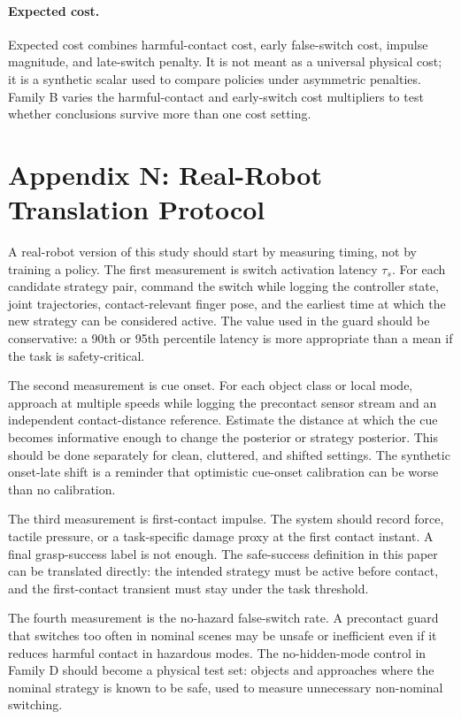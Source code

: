 \documentclass{article}
\begin{document}
\paragraph{Expected cost.}
Expected cost combines harmful-contact cost, early false-switch cost, impulse magnitude, and late-switch penalty. It is not meant as a universal physical cost; it is a synthetic scalar used to compare policies under asymmetric penalties. Family B varies the harmful-contact and early-switch cost multipliers to test whether conclusions survive more than one cost setting.

\section{Appendix N: Real-Robot Translation Protocol}

A real-robot version of this study should start by measuring timing, not by training a policy. The first measurement is switch activation latency $\tau_s$. For each candidate strategy pair, command the switch while logging the controller state, joint trajectories, contact-relevant finger pose, and the earliest time at which the new strategy can be considered active. The value used in the guard should be conservative: a 90th or 95th percentile latency is more appropriate than a mean if the task is safety-critical.

The second measurement is cue onset. For each object class or local mode, approach at multiple speeds while logging the precontact sensor stream and an independent contact-distance reference. Estimate the distance at which the cue becomes informative enough to change the posterior or strategy posterior. This should be done separately for clean, cluttered, and shifted settings. The synthetic onset-late shift is a reminder that optimistic cue-onset calibration can be worse than no calibration.

The third measurement is first-contact impulse. The system should record force, tactile pressure, or a task-specific damage proxy at the first contact instant. A final grasp-success label is not enough. The safe-success definition in this paper can be translated directly: the intended strategy must be active before contact, and the first-contact transient must stay under the task threshold.

The fourth measurement is the no-hazard false-switch rate. A precontact guard that switches too often in nominal scenes may be unsafe or inefficient even if it reduces harmful contact in hazardous modes. The no-hidden-mode control in Family D should become a physical test set: objects and approaches where the nominal strategy is known to be safe, used to measure unnecessary non-nominal switching.
\end{document}
